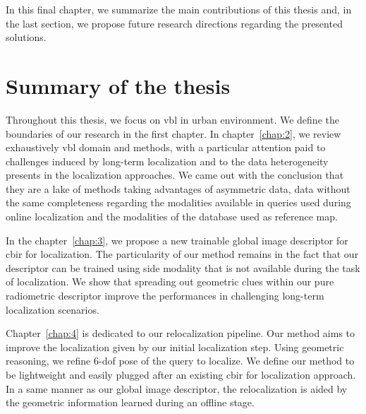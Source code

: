 In this final chapter, we summarize the main contributions of this thesis and, in the last section, we propose future research directions regarding the presented solutions.

\section{Summary of the thesis}

Throughout this thesis, we focus on \ac{vbl} in urban environment. We define the boundaries of our research in the first chapter. In chapter~\ref{chap:2}, we review exhaustively \ac{vbl} domain and methods, with a particular attention paid to challenges induced by long-term localization and to the data heterogeneity presents in the localization approaches. We came out with the conclusion that they are a lake of methods taking advantages of asymmetric data, \ie data without the same completeness regarding the modalities available in queries used during online localization and the modalities of the database used as reference map.

In the chapter~\ref{chap:3}, we propose a new trainable global image descriptor for \ac{cbir} for localization. The particularity of our method remains in the fact that our descriptor can be trained using side modality that is not available during the task of localization. We show that spreading out geometric clues within our pure radiometric descriptor improve the performances in challenging long-term localization scenarios.

Chapter~\ref{chap:4} is dedicated to our relocalization pipeline. Our method aims to improve the localization given by our initial localization step. Using geometric reasoning, we refine 6-\ac{dof} pose of the query to localize. We define our method to be lightweight and easily plugged after an existing \ac{cbir} for localization approach. In a same manner as our global image descriptor, the relocalization is aided by the geometric information learned during an offline stage.
